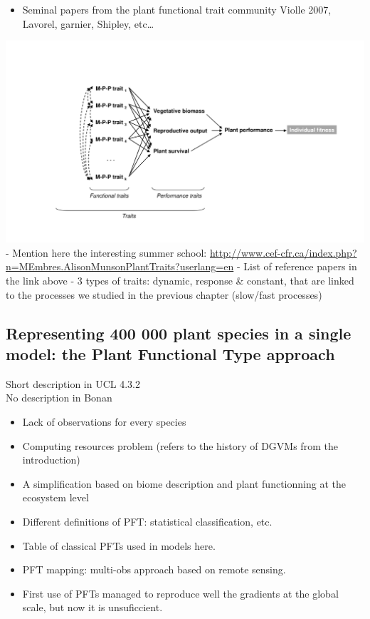 \documentclass[
  oneside]{book}
\providecommand{\tightlist}{%
  \setlength{\itemsep}{0pt}\setlength{\parskip}{0pt}}
\begin{document}
\begin{itemize}
\tightlist
\item
  Seminal papers from the plant functional trait community Violle 2007, Lavorel, garnier, Shipley, etc\ldots{}
\end{itemize}

\includegraphics{figures/Violle2007.jpg}
- Mention here the interesting summer school: \url{http://www.cef-cfr.ca/index.php?n=MEmbres.AlisonMunsonPlantTraits?userlang=en}
- List of reference papers in the link above
- 3 types of traits: dynamic, response \& constant, that are linked to the processes we studied in the previous chapter (slow/fast processes)

\hypertarget{representing-400-000-plant-species-in-a-single-model-the-plant-functional-type-approach}{%
\subsection{Representing 400 000 plant species in a single model: the Plant Functional Type approach}\label{representing-400-000-plant-species-in-a-single-model-the-plant-functional-type-approach}}

Short description in UCL 4.3.2\\
No description in Bonan

\begin{itemize}
\tightlist
\item
  Lack of observations for every species
\item
  Computing resources problem (refers to the history of DGVMs from the introduction)
\item
  A simplification based on biome description and plant functionning at the ecosystem level
\item
  Different definitions of PFT: statistical classification, etc.
\item
  Table of classical PFTs used in models here.
\item
  PFT mapping: multi-obs approach based on remote sensing.
\item
  First use of PFTs managed to reproduce well the gradients at the global scale, but now it is unsuficcient.
\end{itemize}
\end{document}
